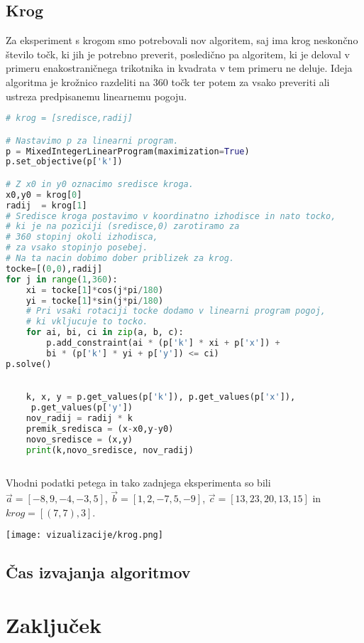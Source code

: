 \documentclass[a4paper, 12pt]{article}
\begin{document}
\subsection{Krog}
Za eksperiment s krogom smo potrebovali nov algoritem, saj ima krog neskončno število točk, ki jih je potrebno preverit,
posledično pa algoritem, ki je 
deloval v primeru enakostraničnega trikotnika in kvadrata v tem primeru ne deluje. Ideja algoritma je krožnico razdeliti na $360$ točk ter potem za vsako
preveriti ali ustreza predpisanemu linearnemu pogoju. 
\begin{lstlisting}[language=Python]
# krog = [sredisce,radij]

# Nastavimo p za linearni program.
p = MixedIntegerLinearProgram(maximization=True)
p.set_objective(p['k'])

# Z x0 in y0 oznacimo sredisce kroga.
x0,y0 = krog[0]
radij  = krog[1]
# Sredisce kroga postavimo v koordinatno izhodisce in nato tocko,
# ki je na poziciji (sredisce,0) zarotiramo za
# 360 stopinj okoli izhodisca,
# za vsako stopinjo posebej.
# Na ta nacin dobimo dober priblizek za krog.
tocke=[(0,0),radij]
for j in range(1,360):
    xi = tocke[1]*cos(j*pi/180)
    yi = tocke[1]*sin(j*pi/180)
    # Pri vsaki rotaciji tocke dodamo v linearni program pogoj,
    # ki vkljucuje to tocko.
    for ai, bi, ci in zip(a, b, c):
        p.add_constraint(ai * (p['k'] * xi + p['x']) + 
        bi * (p['k'] * yi + p['y']) <= ci)
p.solve()
    

    k, x, y = p.get_values(p['k']), p.get_values(p['x']),
     p.get_values(p['y'])
    nov_radij = radij * k
    premik_sredisca = (x-x0,y-y0)
    novo_sredisce = (x,y)
    print(k,novo_sredisce, nov_radij)
    
\end{lstlisting}
Vhodni podatki petega in tako zadnjega eksperimenta so bili $\vec{a}=[-8,9,-4,-3,5]$, $\vec{b}=[1,2,-7,5,-9]$, $\vec{c}=[13,23,20,13,15]$ in $krog=[(7,7),3]$.
\begin{center}
    \texttt{[image: vizualizacije/krog.png]}\\
\end{center}
\subsection{Čas izvajanja algoritmov}
\newpage
\section{Zaključek}
\end{document}
